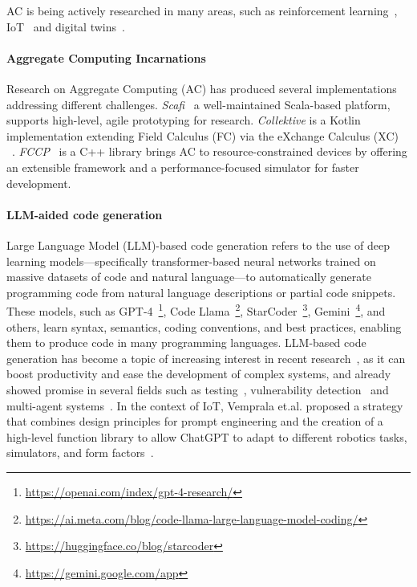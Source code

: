 \documentclass[12pt]{article}
\begin{document}
AC is being actively researched in many areas, such as reinforcement learning~\cite{aguzzi2022towards}, IoT~\cite{beal2015aggregate} and digital twins~\cite{casadei2021digital}.

\paragraph{\textbf{Aggregate Computing Incarnations}} Research on Aggregate Computing (AC) has produced several implementations addressing different challenges.
\textit{Scafi}~\cite{casadei2016towards} a well-maintained Scala-based platform, supports high-level, agile prototyping for research. \textit{Collektive} is a Kotlin implementation extending Field Calculus (FC) via the eXchange Calculus (XC) ~\cite{audrito2024exchange}.
\textit{FCCP}~\cite{audrito2024fcpp} is a C++ library brings AC to resource-constrained devices by offering an extensible framework and a performance-focused simulator for faster development.

\paragraph{LLM-aided code generation}
\sloppypar
Large Language Model (LLM)-based code generation refers to the use of deep learning models—specifically transformer-based neural networks trained on massive datasets of code and natural language—to automatically generate
programming code from natural language descriptions or partial code snippets. These models, such as GPT-4~\footnote{\url{https://openai.com/index/gpt-4-research/}}, 
Code Llama~\footnote{\url{https://ai.meta.com/blog/code-llama-large-language-model-coding/}}, StarCoder~\footnote{\url{https://huggingface.co/blog/starcoder}}, Gemini~\footnote{\url{https://gemini.google.com/app}}, 
and others, learn syntax, semantics, coding conventions, and best practices, enabling them to produce
code in many programming languages.
LLM-based code generation has become a topic of increasing interest in recent research~\cite{wang2023review}, as it can boost productivity and ease the development of complex systems, and already showed promise in several fields such as
testing~\cite{hudson2024software}, vulnerability detection~\cite{zhou2025large} and multi-agent systems~\cite{he2025llm}.
In the context of IoT, Vemprala et.al. proposed a strategy that combines design principles for prompt engineering and the creation
of a high-level function library to allow ChatGPT to adapt to different robotics tasks, simulators, and form factors~\cite{vemprala2024chatgpt}.
\end{document}
